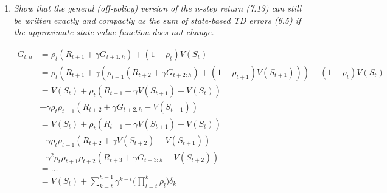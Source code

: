 \documentclass[12pt,a4paper]{article}
\begin{document}
\begin{enumerate}
  \item
    \textit{Show that the general (off-policy) version of the n-step return (7.13) can
    still be written exactly and compactly as the sum of state-based TD errors (6.5)
    if the approximate state value function does not change.}

    \begin{align*}
      G_{t: h} &= \rho_t (R_{t + 1} + \gamma G_{t + 1: h}) + (1 - \rho_t)V(S_t)\\
      &= \rho_t (R_{t + 1} + \gamma (
      \rho_{t + 1} (R_{t + 2} + \gamma G_{t + 2: h}) + (1 - \rho_{t + 1})V(S_{t + 1})
      )) + (1 - \rho_t)V(S_t)\\
      &= V(S_t) + \rho_t (R_{t + 1} + \gamma V(S_{t + 1}) - V(S_t))\\
      &+ \gamma \rho_t \rho_{t + 1} (R_{t + 2} + \gamma G_{t + 2: h} - V(S_{t + 1}))\\
      &= V(S_t) + \rho_t (R_{t + 1} + \gamma V(S_{t + 1}) - V(S_t))\\
      &+ \gamma \rho_t \rho_{t + 1} (R_{t + 2} + \gamma V(S_{t + 2}) - V(S_{t + 1}))\\
      &+ \gamma ^ 2 \rho_t \rho_{t + 1} \rho_{t + 2} (R_{t + 3} + \gamma G_{t + 3: h} - V(S_{t + 2}))\\
      &= \dots \\
      &= V(S_t) + \sum\limits_{k = t}^{h - 1} \gamma^{k - t} \Big(\prod_{l = t}^k
      \rho_l\Big) \delta_k
    \end{align*}

\end{enumerate}
\end{document}
